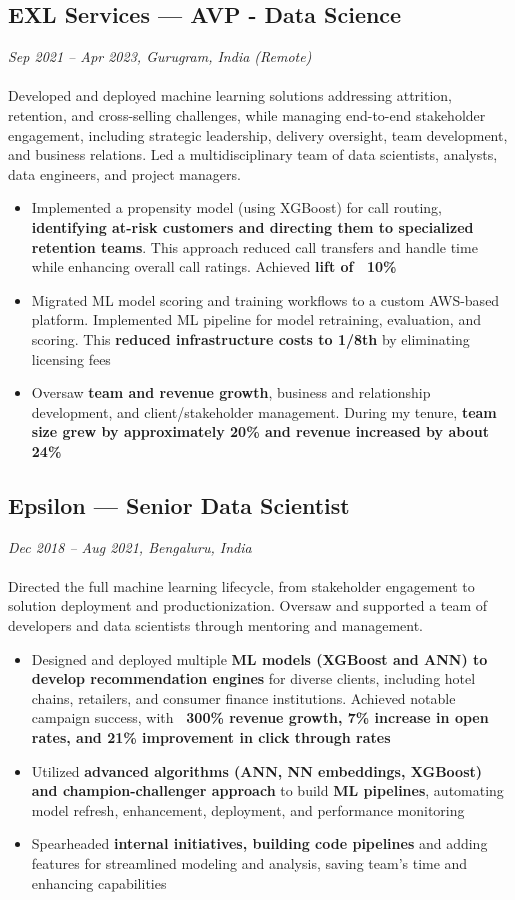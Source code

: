 \documentclass[a4paper,10pt]{article}
\begin{document}
\subsection*{EXL Services — AVP - Data Science}
\textit{Sep 2021 – Apr 2023, Gurugram, India (Remote)} \\
\\
Developed and deployed machine learning solutions addressing attrition, retention, and cross-selling challenges, while managing end-to-end stakeholder engagement, including strategic leadership, delivery oversight, team development, and business relations. Led a multidisciplinary team of data scientists, analysts, data engineers, and project managers.
\begin{itemize}
    \item Implemented a propensity model (using XGBoost) for call routing, \textbf{identifying at-risk customers and directing them to specialized retention teams}. This approach reduced call transfers and handle time while enhancing overall call ratings. Achieved \textbf{lift of ~10\%}
    \item Migrated ML model scoring and training workflows to a custom AWS-based platform. Implemented ML pipeline for model retraining, evaluation, and scoring. This \textbf{reduced infrastructure costs to 1/8th} by eliminating licensing fees
    \item Oversaw \textbf{team and revenue growth}, business and relationship development, and client/stakeholder management. During my tenure, \textbf{team size grew by approximately 20\% and revenue increased by about 24\%}
\end{itemize}

\subsection*{Epsilon — Senior Data Scientist}
\textit{Dec 2018 – Aug 2021, Bengaluru, India}
\\
\\
Directed the full machine learning lifecycle, from stakeholder engagement to solution deployment and productionization. Oversaw and supported a team of developers and data scientists through mentoring and management.
\begin{itemize}
    \item Designed and deployed multiple \textbf{ML models (XGBoost and ANN) to develop recommendation engines} for diverse clients, including hotel chains, retailers, and consumer finance institutions. Achieved notable campaign success, with \textbf{~300\% revenue growth, 7\% increase in open rates, and 21\% improvement in click through rates}
    \item Utilized \textbf{advanced algorithms (ANN, NN embeddings, XGBoost) and champion-challenger approach} to build \textbf{ML pipelines}, automating model refresh, enhancement, deployment, and performance monitoring
    \item Spearheaded \textbf{internal initiatives, building code pipelines} and adding features for streamlined modeling and analysis, saving team's time and enhancing capabilities
\end{itemize}
\end{document}

